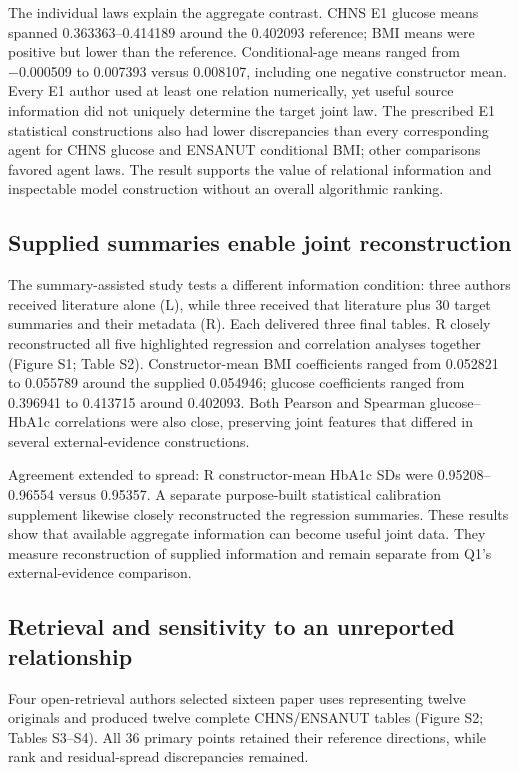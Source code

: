 \documentclass[sigconf,anonymous,review]{acmart}
\begin{document}
The individual laws explain the aggregate contrast. CHNS E1 glucose means spanned 0.363363–\allowbreak{}0.414189 around the 0.402093 reference; BMI means were positive but lower than the reference. Conditional-age means ranged from −0.000509 to 0.007393 versus 0.008107, including one negative constructor mean. Every E1 author used at least one relation numerically, yet useful source information did not uniquely determine the target joint law. The prescribed E1 statistical constructions also had lower discrepancies than every corresponding agent for CHNS glucose and ENSANUT conditional BMI; other comparisons favored agent laws. The result supports the value of relational information and inspectable model construction without an overall algorithmic ranking.


\subsection{Supplied summaries enable joint reconstruction}

The summary-assisted study tests a different information condition: three authors received literature alone (L), while three received that literature plus 30 target summaries and their metadata (R). Each delivered three final tables. R closely reconstructed all five highlighted regression and correlation analyses together (Figure S1; Table S2). Constructor-mean BMI coefficients ranged from 0.052821 to 0.055789 around the supplied 0.054946; glucose coefficients ranged from 0.396941 to 0.413715 around 0.402093. Both Pearson and Spearman glucose–\allowbreak{}HbA1c correlations were also close, preserving joint features that differed in several external-evidence constructions.


Agreement extended to spread: R constructor-mean HbA1c SDs were 0.95208–\allowbreak{}0.96554 versus 0.95357. A separate purpose-built statistical calibration supplement likewise closely reconstructed the regression summaries. These results show that available aggregate information can become useful joint data. They measure reconstruction of supplied information and remain separate from Q1's external-evidence comparison.


\subsection{Retrieval and sensitivity to an unreported relationship}

Four open-retrieval authors selected sixteen paper uses representing twelve originals and produced twelve complete CHNS/\allowbreak{}ENSANUT tables (Figure S2; Tables S3–\allowbreak{}S4). All 36 primary points retained their reference directions, while rank and residual-spread discrepancies remained.
\end{document}
